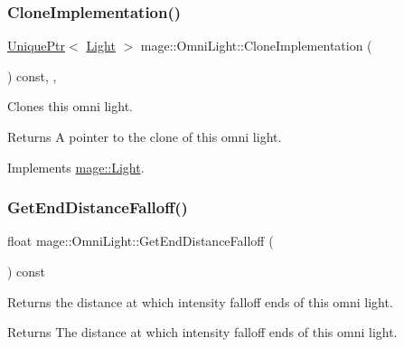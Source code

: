 \subsubsection{\texorpdfstring{Clone\+Implementation()}{CloneImplementation()}}
{\footnotesize\ttfamily \hyperlink{namespacemage_a3316d7143a973e37adf1110f2e80ca31}{Unique\+Ptr}$<$ \hyperlink{classmage_1_1_light}{Light} $>$ mage\+::\+Omni\+Light\+::\+Clone\+Implementation (\begin{DoxyParamCaption}{ }\end{DoxyParamCaption}) const\hspace{0.3cm}{\ttfamily [override]}, {\ttfamily [private]}, {\ttfamily [virtual]}}

Clones this omni light.

\begin{DoxyReturn}{Returns}
A pointer to the clone of this omni light. 
\end{DoxyReturn}


Implements \hyperlink{classmage_1_1_light_aa613d76a1ebda69efde853d15f75490c}{mage\+::\+Light}.

\hypertarget{classmage_1_1_omni_light_a1bd4d9eb6a22ae78e1780f142039611c}{}\label{classmage_1_1_omni_light_a1bd4d9eb6a22ae78e1780f142039611c} 
\subsubsection{\texorpdfstring{Get\+End\+Distance\+Falloff()}{GetEndDistanceFalloff()}}
{\footnotesize\ttfamily float mage\+::\+Omni\+Light\+::\+Get\+End\+Distance\+Falloff (\begin{DoxyParamCaption}{ }\end{DoxyParamCaption}) const\hspace{0.3cm}{\ttfamily [noexcept]}}

Returns the distance at which intensity falloff ends of this omni light.

\begin{DoxyReturn}{Returns}
The distance at which intensity falloff ends of this omni light. 
\end{DoxyReturn}
\hypertarget{classmage_1_1_omni_light_a6f70a9cca052fa2228aeab4c44ca8a0b}{}\label{classmage_1_1_omni_light_a6f70a9cca052fa2228aeab4c44ca8a0b} 
